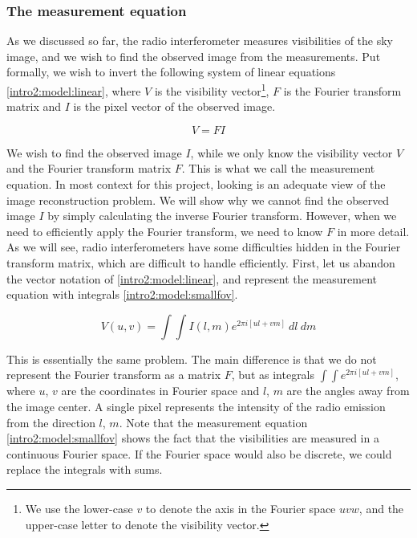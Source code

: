 \subsubsection{The measurement equation}
As we discussed so far, the radio interferometer measures visibilities of the sky image, and we wish to find the observed image from the measurements. Put formally, we wish to invert the following system of linear equations \eqref{intro2:model:linear}, where $V$ is the visibility vector\footnote{We use the lower-case $v$ to denote the axis in the Fourier space $uvw$, and the upper-case letter to denote the visibility vector.}, $F$ is the Fourier transform matrix and $I$ is the pixel vector of the observed image.

\begin{equation}\label{intro2:model:linear}
V = F I
\end{equation}

We wish to find the observed image $I$, while we only know the visibility vector $V$ and the Fourier transform matrix $F$. This is what we call the measurement equation. In most context for this project, looking is an adequate view of the image reconstruction problem. We will show why we cannot find the observed image $I$ by simply calculating the inverse Fourier transform. However, when we need to efficiently apply the Fourier transform, we need to know $F$ in more detail. As we will see, radio interferometers have some difficulties hidden in the Fourier transform matrix, which are difficult to handle efficiently. First, let us abandon the vector notation of \eqref{intro2:model:linear}, and represent the measurement equation with integrals \eqref{intro2:model:smallfov}.

\begin{equation}\label{intro2:model:smallfov}
V(u, v) = \int\int I(l, m)  e^{2 \pi i [ul+vm]} \: dl \: dm
\end{equation}

This is essentially the same problem. The main difference is that we do not represent the Fourier transform as a matrix $F$, but as integrals $\int\int e^{2 \pi i [ul+vm]}$, where $u$, $v$ are the coordinates in Fourier space and $l$, $m$ are the angles away from the image center. A single pixel represents the intensity of the radio emission from the direction $l$, $m$. Note that the measurement equation \eqref{intro2:model:smallfov} shows the fact that the visibilities are measured in a continuous Fourier space. If the Fourier space would also be discrete, we could replace the integrals with sums.

